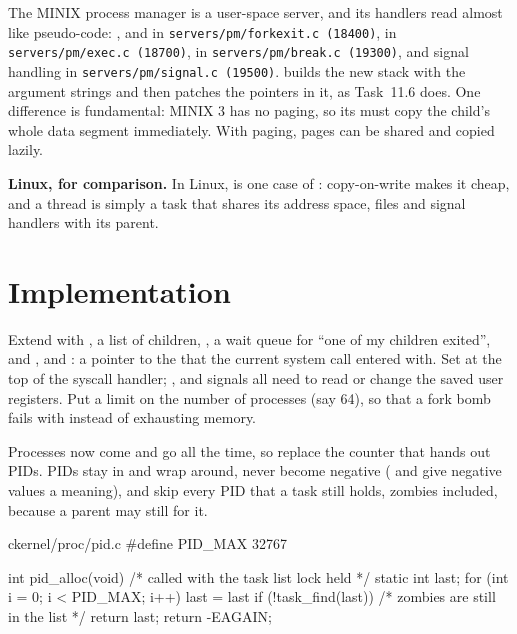 \documentclass[11pt,a4paper]{article}
\begin{document}
\begin{minixbox}
The MINIX process manager is a user-space server, and its handlers read almost like pseudo-code:
,  and  in \texttt{servers/pm/forkexit.c (18400)},  in
\texttt{servers/pm/exec.c (18700)},  in \texttt{servers/pm/break.c (19300)}, and signal handling in
\texttt{servers/pm/signal.c (19500)}.  builds the new stack with the argument strings and then
patches the pointers in it, as Task~11.6 does. One difference is fundamental: MINIX 3 has no paging,
so its  must copy the child's whole data segment immediately. With paging, pages can be shared and copied lazily.

\par\smallskip\textbf{Linux, for comparison.} \LKD In Linux,  is one case of : copy-on-write makes it cheap, and a thread is simply a task that shares its address space, files and signal handlers with its parent.
\end{minixbox}

\section{Implementation}

Extend  with , a list of children, , a wait queue for ``one of my children
exited'',  and , and : a pointer to the  that the current system
call entered with. Set  at the top of the syscall handler; ,  and signals
all need to read or change the saved user registers. Put a limit on the number of processes (say 64), so that a fork
bomb fails with  instead of exhausting memory.

Processes now come and go all the time, so replace the counter that hands out PIDs. PIDs stay in  and
wrap around, never become negative ( and  give negative values a meaning), and skip every
PID that a task still holds, zombies included, because a parent may still  for it.

\begin{lst}{c}{kernel/proc/pid.c}
#define PID_MAX 32767

int pid_alloc(void)                          /* called with the task list lock held */
{
    static int last;
    for (int i = 0; i < PID_MAX; i++) {
        last = last %
        if (!task_find(last))                /* zombies are still in the list */
            return last;
    }
    return -EAGAIN;
}
\end{lst}
\end{document}
